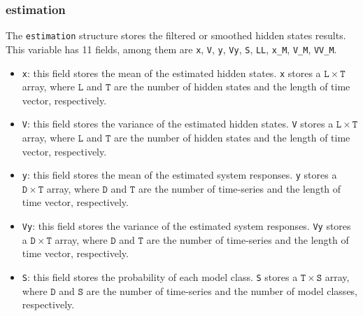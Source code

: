 {\subsubsection{estimation} 
The \lstinline[basicstyle = \mlttfamily \small ]!estimation! structure stores the filtered or smoothed hidden states results.
This variable has 11 fields, among them  are \lstinline[basicstyle = \mlttfamily \small ]!x!, \lstinline[basicstyle = \mlttfamily \small ]!V!, \lstinline[basicstyle = \mlttfamily \small ]!y!, \lstinline[basicstyle = \mlttfamily \small ]!Vy!,  \lstinline[basicstyle = \mlttfamily \small ]!S!, \lstinline[basicstyle = \mlttfamily \small ]!LL!, \lstinline[basicstyle = \mlttfamily \small ]!x_M!, \lstinline[basicstyle = \mlttfamily \small ]!V_M!, \lstinline[basicstyle = \mlttfamily \small ]!VV_M!.

\begin{itemize}
\item \lstinline[basicstyle = \mlttfamily \small ]!x!: this field stores the mean of the estimated hidden states. \lstinline[basicstyle = \mlttfamily \small ]!x! stores a $\mathtt{L} \times \mathtt{T}$ array, where $\mathtt{L}$ and $\mathtt{T}$ are the number of hidden states and the length of time vector, respectively. 
\item \lstinline[basicstyle = \mlttfamily \small ]!V!: this field stores the variance of the estimated hidden states. \lstinline[basicstyle = \mlttfamily \small ]!V! stores a $\mathtt{L} \times \mathtt{T}$ array, where $\mathtt{L}$ and $\mathtt{T}$ are the number of hidden states and the length of time vector, respectively. 
\item \lstinline[basicstyle = \mlttfamily \small ]!y!: this field stores the mean of the estimated system responses. \lstinline[basicstyle = \mlttfamily \small ]!y! stores a $\mathtt{D} \times \mathtt{T}$ array, where $\mathtt{D}$ and $\mathtt{T}$ are the number of time-series and the length of time vector, respectively. 
\item \lstinline[basicstyle = \mlttfamily \small ]!Vy!: this field stores the variance of the estimated system responses. \lstinline[basicstyle = \mlttfamily \small ]!Vy! stores a $\mathtt{D} \times \mathtt{T}$ array, where $\mathtt{D}$ and $\mathtt{T}$ are the number of time-series and the length of time vector, respectively. 
\item \lstinline[basicstyle = \mlttfamily \small ]!S!: this field stores the probability of each model class. \lstinline[basicstyle = \mlttfamily \small ]!S! stores a $\mathtt{T} \times \mathtt{S}$ array, where $\mathtt{D}$ and $\mathtt{S}$ are the number of time-series and the number of model classes, respectively. 

\end{itemize}}
